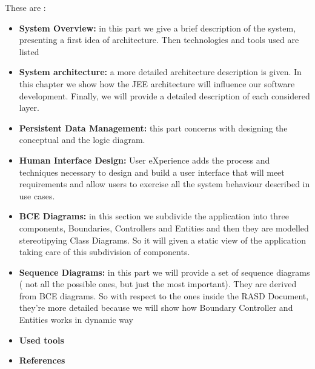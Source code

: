 \documentclass[12pt]{book}
\begin{document}
These are : 
\begin{itemize}
\item{\textbf{System Overview: }} in this part we give a brief description of the system, presenting a first idea of architecture. Then technologies and tools used are listed
\item{\textbf{System architecture: }} a more detailed architecture description is given. In this chapter we show how the JEE architecture will influence our software development. 
Finally, we will provide a detailed description of each considered layer. 
\item{\textbf{Persistent Data Management: }} this part concerns with designing the conceptual and the logic diagram. 
\item{\textbf{Human Interface Design: }}User eXperience adds the process and techniques necessary to design and build a user interface that will meet requirements and allow users to exercise all the system behaviour described in use cases. 
\item{\textbf{BCE Diagrams: }}in this section we subdivide the application into three components, Boundaries, Controllers and Entities and then they are modelled stereotipying Class Diagrams. So it will given a static view of the application taking care of this subdivision of components. 
\item{\textbf{Sequence Diagrams: }}in this part we will provide a set of sequence diagrams ( not all the possible ones, but just the most important). They are derived from BCE diagrams. So with respect to the ones inside the RASD Document, they're more detailed because we will show how Boundary Controller and Entities works in dynamic way
\item{\textbf{Used tools }} 
\item{\textbf{References }}
\end{itemize}
\end{document}
